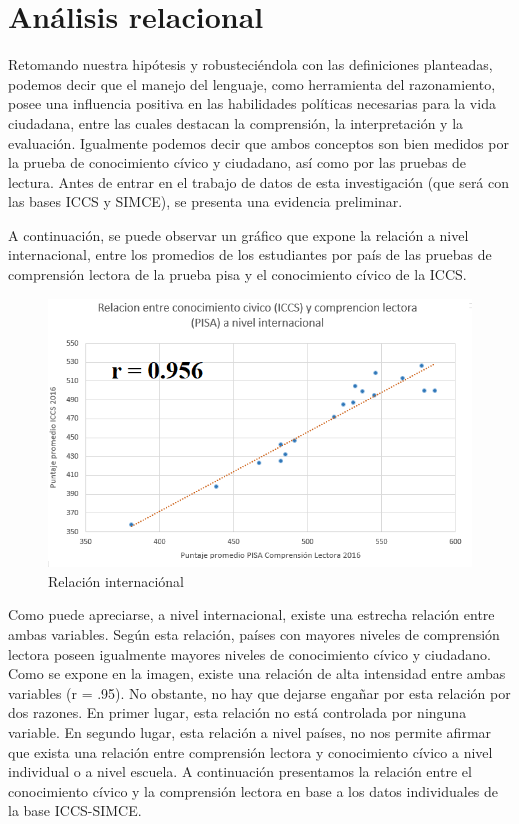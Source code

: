 \documentclass[12pt,twoside]{templates/facsothesis}
\begin{document}
\newpage

\hypertarget{anuxe1lisis-relacional}{%
\section{Análisis relacional}\label{anuxe1lisis-relacional}}

Retomando nuestra hipótesis y robusteciéndola con las definiciones planteadas, podemos decir que el manejo del lenguaje, como herramienta del razonamiento, posee una influencia positiva en las habilidades políticas necesarias para la vida ciudadana, entre las cuales destacan la comprensión, la interpretación y la evaluación. Igualmente podemos decir que ambos conceptos son bien medidos por la prueba de conocimiento cívico y ciudadano, así como por las pruebas de lectura. Antes de entrar en el trabajo de datos de esta investigación (que será con las bases ICCS y SIMCE), se presenta una evidencia preliminar.

A continuación, se puede observar un gráfico que expone la relación a nivel internacional, entre los promedios de los estudiantes por país de las pruebas de comprensión lectora de la prueba pisa y el conocimiento cívico de la ICCS.

\begin{figure}

{\centering \includegraphics[width=1\linewidth]{images/relacionmacro} 

}

\caption{Relación internaciónal}\label{fig:unnamed-chunk-8}
\end{figure}

Como puede apreciarse, a nivel internacional, existe una estrecha relación entre ambas variables. Según esta relación, países con mayores niveles de comprensión lectora poseen igualmente mayores niveles de conocimiento cívico y ciudadano. Como se expone en la imagen, existe una relación de alta intensidad entre ambas variables (r = .95). No obstante, no hay que dejarse engañar por esta relación por dos razones. En primer lugar, esta relación no está controlada por ninguna variable. En segundo lugar, esta relación a nivel países, no nos permite afirmar que exista una relación entre comprensión lectora y conocimiento cívico a nivel individual o a nivel escuela. A continuación presentamos la relación entre el conocimiento cívico y la comprensión lectora en base a los datos individuales de la base ICCS-SIMCE.
\end{document}
